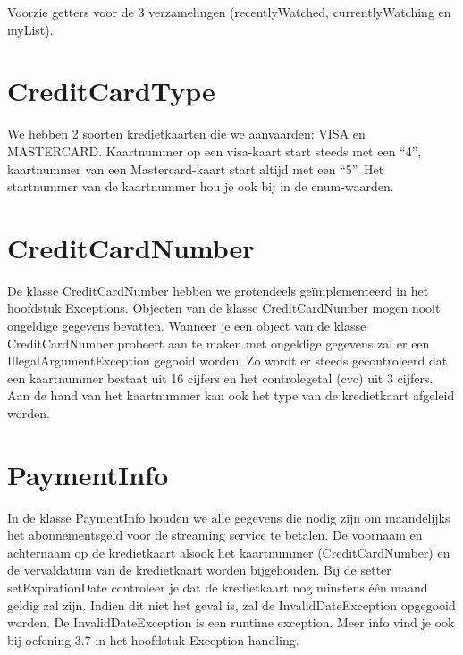 \documentclass{tstextbook}
\begin{document}
Voorzie getters voor de 3 verzamelingen (recentlyWatched, currentlyWatching en myList).

\section{CreditCardType}

We hebben 2 soorten kredietkaarten die we aanvaarden: VISA en MASTERCARD. Kaartnummer op een visa-kaart start steeds met een ``4'',  kaartnummer van een Mastercard-kaart start altijd met een ``5''.  Het startnummer van de kaartnummer hou je ook bij in de enum-waarden.

\section{CreditCardNumber}

De klasse CreditCardNumber hebben we grotendeels ge\"implementeerd in het hoofdstuk Exceptions. Objecten van de klasse CreditCardNumber mogen nooit ongeldige gegevens bevatten. Wanneer je een object van de klasse CreditCardNumber probeert aan te maken met ongeldige gegevens zal er een IllegalArgumentException gegooid worden.
Zo wordt er steeds gecontroleerd dat een kaartnummer bestaat uit 16 cijfers en het controlegetal (cvc) uit 3 cijfers. Aan de hand van het kaartnummer kan ook het type van de kredietkaart afgeleid worden.

\section{PaymentInfo}

In de klasse PaymentInfo houden we alle gegevens die nodig zijn om maandelijks het abonnementsgeld voor de streaming service te betalen. De voornaam en achternaam op de kredietkaart alsook het kaartnummer (CreditCardNumber) en de vervaldatum van de kredietkaart worden bijgehouden. 
Bij de setter setExpirationDate controleer je dat de kredietkaart nog minstens \'e\'en maand geldig zal zijn. Indien dit niet het geval is, zal de InvalidDateException opgegooid worden. De InvalidDateException is een runtime exception. Meer info vind je ook bij oefening 3.7 in het hoofdstuk Exception handling.
\end{document}
